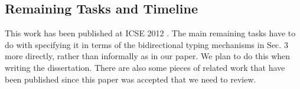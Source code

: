 \subsection{Remaining Tasks and Timeline}
This work has been published at ICSE 2012 \cite{Omar:2012:ACC:2337223.2337324}. The main remaining tasks have to do with specifying it in terms of the bidirectional typing mechanisms in Sec. 3 more directly, rather than informally as in our paper. We plan to do this when writing the dissertation. There are also some pieces of related work that have been published since this paper was accepted that we need to review. 
